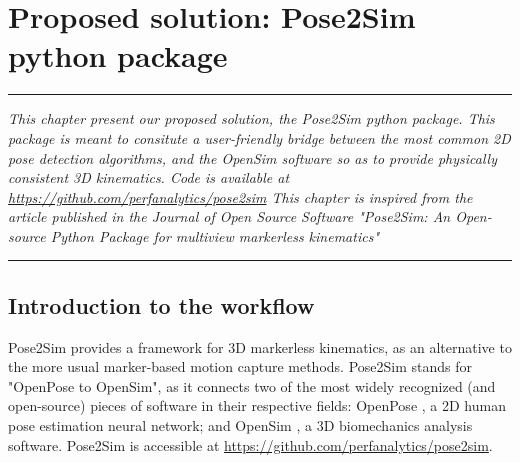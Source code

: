 
\lhead[\fancyplain{}{\leftmark}]%
      {\fancyplain{}{}} %
\chead[\fancyplain{}{}]%
      {\fancyplain{}{}}
\rhead[\fancyplain{}{}]%
      {\fancyplain{}{\rightmark}}%
\lfoot[\fancyplain{}{}]%
      {\fancyplain{}{}}
\cfoot[\fancyplain{}{\thepage}]%
      {\fancyplain{}{\thepage}} %
\rfoot[\fancyplain{}{}]%
     {\fancyplain{}{\scriptsize}}



\chapter[Pose2Sim]{Proposed solution: Pose2Sim python package}
\label{ch:3}


\begin{center}
\rule{0.7\linewidth}{.5pt}
\begin{minipage}{0.7\linewidth}
\smallskip

\textit{This chapter present our proposed solution, the Pose2Sim python package. This package is meant to consitute a user-friendly bridge between the most common 2D pose detection algorithms, and the OpenSim software so as to provide physically consistent 3D kinematics. Code is available at \url{https://github.com/perfanalytics/pose2sim} \newline \newline
This chapter is inspired from the article published in the Journal of Open Source Software "Pose2Sim: An Open-source Python Package for multiview markerless kinematics" \cite{Pagnon2022b}}

\end{minipage}
\smallskip
\rule{0.7\linewidth}{.5pt}
\end{center}

\minitoc
\newpage


\section{Introduction to the workflow}
Pose2Sim provides a framework for 3D markerless kinematics, as an alternative to the more usual marker-based motion capture methods. Pose2Sim stands for "OpenPose to OpenSim", as it connects two of the most widely recognized (and open-source) pieces of software in their respective fields: OpenPose \cite{Cao2019}, a 2D human pose estimation neural network; and OpenSim \cite{Delp2007,Seth2018}, a 3D biomechanics analysis software. Pose2Sim is accessible at \url{https://github.com/perfanalytics/pose2sim}.

